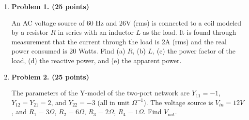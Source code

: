 \begin{enumerate}

\item {\bf Problem 1. (25 points)} 

An AC voltage source of 60 Hz and 26V (rms) is connected to a coil
modeled by a resistor $R$ in series with an inductor $L$ as the load. 
It is found through measurement that the current through the load is 
2A (rms) and the real power consumed is 20 Watts. Find (a) $R$, (b) $L$,
(c) the power factor of the load, (d) the reactive power, and (e) the 
apparent power.



\item {\bf Problem 2. (25 points)} 

The parameters of the Y-model of the two-port network are $Y_{11}=-1$,
$Y_{12}=Y_{21}=2$, and $Y_{22}=-3$ (all in unit $\Omega^{-1}$). The 
voltage source is $V_{in}=12V$, and $R_1=3\Omega$, $R_2=6\Omega$, 
$R_3=2\Omega$, $R_4=1\Omega$. Find $V_{out}$.



\end{enumerate}
